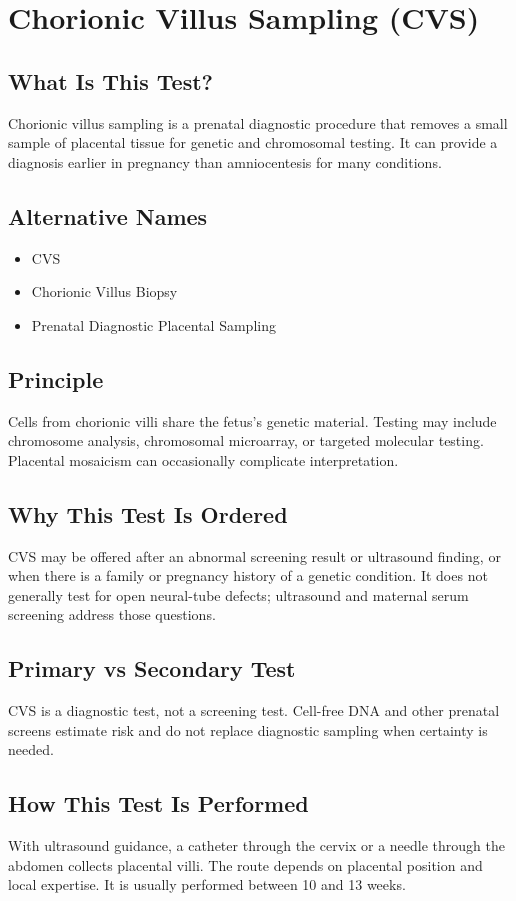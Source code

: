 \chapter{Chorionic Villus Sampling (CVS)}
\section*{What Is This Test?}
Chorionic villus sampling is a prenatal diagnostic procedure that removes a small sample of placental tissue for genetic and chromosomal testing. It can provide a diagnosis earlier in pregnancy than amniocentesis for many conditions.
\section*{Alternative Names}
\begin{itemize}\item CVS\item Chorionic Villus Biopsy\item Prenatal Diagnostic Placental Sampling\end{itemize}
\section*{Principle}
Cells from chorionic villi share the fetus's genetic material. Testing may include chromosome analysis, chromosomal microarray, or targeted molecular testing. Placental mosaicism can occasionally complicate interpretation.
\section*{Why This Test Is Ordered}
CVS may be offered after an abnormal screening result or ultrasound finding, or when there is a family or pregnancy history of a genetic condition. It does not generally test for open neural-tube defects; ultrasound and maternal serum screening address those questions.
\section*{Primary vs Secondary Test}
CVS is a diagnostic test, not a screening test. Cell-free DNA and other prenatal screens estimate risk and do not replace diagnostic sampling when certainty is needed.
\section*{How This Test Is Performed}
With ultrasound guidance, a catheter through the cervix or a needle through the abdomen collects placental villi. The route depends on placental position and local expertise. It is usually performed between 10 and 13 weeks.
